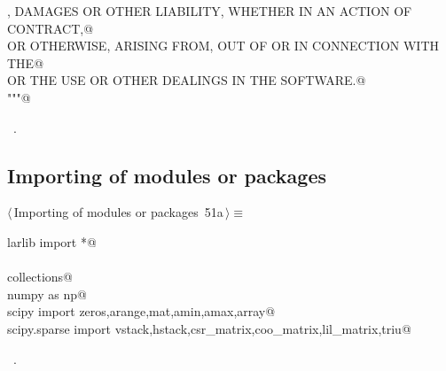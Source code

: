 \documentclass[11pt,oneside]{article}    %
\begin{document}
\begin{flushleft}
\begin{list}{}{}
\mbox{}\verb@CLAIM, DAMAGES OR OTHER LIABILITY, WHETHER IN AN ACTION OF CONTRACT,@\\
\mbox{}\verb@TORT OR OTHERWISE, ARISING FROM, OUT OF OR IN CONNECTION WITH THE@\\
\mbox{}\verb@SOFTWARE OR THE USE OR OTHER DEALINGS IN THE SOFTWARE.@\\
\mbox{}\verb@"""@\\
\mbox{}\verb@@{\NWsep}
\end{list}
\vspace{-1ex}
\footnotesize\addtolength{\baselineskip}{-1ex}
\begin{list}{}{\setlength{\itemsep}{-\parsep}\setlength{\itemindent}{-\leftmargin}}
\item \NWtxtMacroRefIn\ .
\end{list}
\end{flushleft}
\subsection{Importing of modules or packages}
\begin{flushleft} \small \label{scrap81}
\protect{}$\langle\,$Importing of modules or packages\nobreak\ {\footnotesize 51a}$\,\rangle\equiv$
\vspace{-1ex}
\begin{list}{}{} \item
\mbox{}\verb@from larlib import *@\\
\mbox{}\verb@@\\
\mbox{}\verb@import collections@\\
\mbox{}\verb@import numpy as np@\\
\mbox{}\verb@from scipy import zeros,arange,mat,amin,amax,array@\\
\mbox{}\verb@from scipy.sparse import vstack,hstack,csr_matrix,coo_matrix,lil_matrix,triu@\\
\mbox{}\verb@@{\NWsep}
\end{list}
\vspace{-1ex}
\footnotesize\addtolength{\baselineskip}{-1ex}
\begin{list}{}{\setlength{\itemsep}{-\parsep}\setlength{\itemindent}{-\leftmargin}}
\item \NWtxtMacroRefIn\ .
\end{list}
\end{flushleft}
\end{document}
